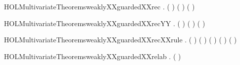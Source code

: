 \newcommand{\HOLMultivariateTheoremsweaklyXXguardedXXprefixXXrule}{\UseVerbatim{HOLMultivariateTheoremsweaklyXXguardedXXprefixXXrule}}
\begin{SaveVerbatim}{HOLMultivariateTheoremsweaklyXXguardedXXrec}
\HOLTokenTurnstile{} \HOLSymConst{\HOLTokenForall{}}  .
         (  ) \HOLSymConst{\HOLTokenImp{}}
       \HOLSymConst{\HOLTokenNeg{}}   \HOLSymConst{\HOLTokenConj{}}  ( ) ( )
\end{SaveVerbatim}
\newcommand{\HOLMultivariateTheoremsweaklyXXguardedXXrec}{\UseVerbatim{HOLMultivariateTheoremsweaklyXXguardedXXrec}}
\begin{SaveVerbatim}{HOLMultivariateTheoremsweaklyXXguardedXXrecYY}
\HOLTokenTurnstile{} \HOLSymConst{\HOLTokenForall{}}  .
         (  ) \HOLSymConst{\HOLTokenImp{}}
       \HOLSymConst{\HOLTokenNeg{}}   \HOLSymConst{\HOLTokenConj{}}  ( ) ( ) \HOLSymConst{\HOLTokenConj{}}
         
\end{SaveVerbatim}
\newcommand{\HOLMultivariateTheoremsweaklyXXguardedXXrecYY}{\UseVerbatim{HOLMultivariateTheoremsweaklyXXguardedXXrecYY}}
\begin{SaveVerbatim}{HOLMultivariateTheoremsweaklyXXguardedXXrecXXrule}
\HOLTokenTurnstile{} \HOLSymConst{\HOLTokenForall{}}  .
       \HOLSymConst{\HOLTokenNeg{}}   \HOLSymConst{\HOLTokenConj{}}  ( ) ( ) \HOLSymConst{\HOLTokenConj{}}
        ( ) ( ) \HOLSymConst{\HOLTokenImp{}}
         (  )
\end{SaveVerbatim}
\newcommand{\HOLMultivariateTheoremsweaklyXXguardedXXrecXXrule}{\UseVerbatim{HOLMultivariateTheoremsweaklyXXguardedXXrecXXrule}}
\begin{SaveVerbatim}{HOLMultivariateTheoremsweaklyXXguardedXXrelab}
\HOLTokenTurnstile{} \HOLSymConst{\HOLTokenForall{}}  .
         (  ) \HOLSymConst{\HOLTokenImp{}}   
\end{SaveVerbatim}
